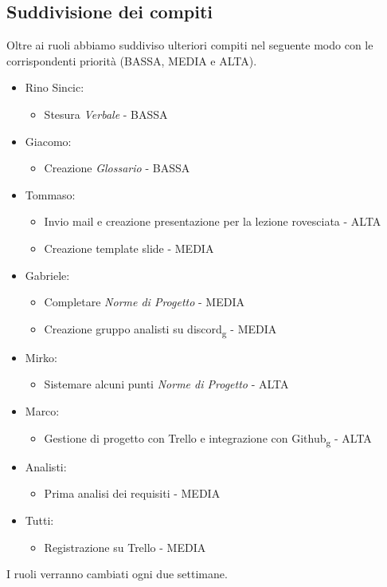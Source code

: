 \subsection{Suddivisione dei compiti}
Oltre ai ruoli abbiamo suddiviso ulteriori compiti nel seguente modo con le corrispondenti priorità (BASSA, MEDIA e ALTA).
\begin{itemize}
    \item Rino Sincic:
    \begin{itemize}
        \item Stesura \textit{Verbale} - BASSA
    \end{itemize}
    \item Giacomo:
    \begin{itemize}
        \item Creazione \textit{Glossario} - BASSA
    \end{itemize}
    \item Tommaso:
    \begin{itemize}
        \item Invio mail e creazione presentazione per la lezione rovesciata - ALTA
        \item Creazione template slide - MEDIA
    \end{itemize}
    \item Gabriele:
    \begin{itemize}
        \item Completare \textit{Norme di Progetto} - MEDIA
        \item Creazione gruppo analisti su discord\textsubscript{g} - MEDIA
    \end{itemize}
    \item Mirko:
    \begin{itemize}
        \item Sistemare alcuni punti \textit{Norme di Progetto} - ALTA
    \end{itemize}
\newpage
    \item Marco:
    \begin{itemize}
        \item Gestione di progetto con Trello e integrazione con Github\textsubscript{g} - ALTA
    \end{itemize}
    \item Analisti:
    \begin{itemize}
        \item Prima analisi dei requisiti - MEDIA
    \end{itemize}
    \item Tutti:
    \begin{itemize}
        \item Registrazione su Trello - MEDIA
    \end{itemize}
\end{itemize}
I ruoli verranno cambiati ogni due settimane.
